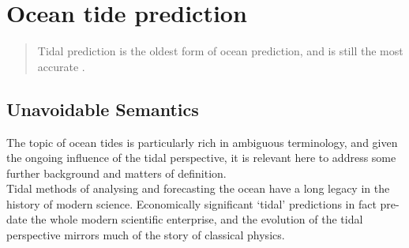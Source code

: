 \section{Ocean tide prediction}
\label{S:TIDE}

\begin{quote}
Tidal prediction is the oldest form of ocean prediction, and is still the most accurate \citep{Parker:2007wq}. 
\end{quote}

\subsection{Unavoidable Semantics}
\label{SS:semantics}
The topic of ocean tides is particularly rich in ambiguous terminology, and given the ongoing influence of the tidal perspective, it is relevant here to address some further background and matters of definition.\\ 
Tidal methods of analysing and forecasting the ocean have a long legacy in the history of modern science.  Economically significant `tidal' predictions in fact pre-date the whole modern scientific enterprise, and the evolution of the tidal perspective mirrors much of the story of classical physics.\\

